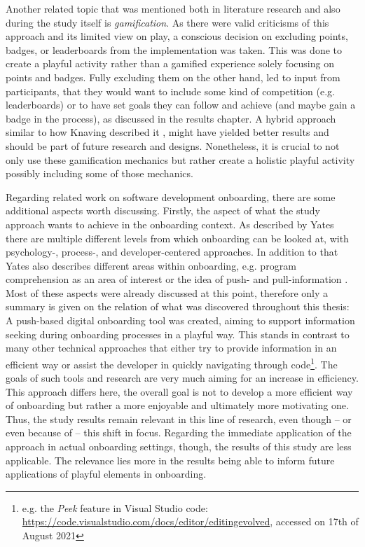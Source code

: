 Another related topic that was mentioned both in literature research and also during the study itself is \textit{gamification}. As there were valid criticisms of this approach and its limited view on play, a conscious decision on excluding points, badges, or leaderboards from the implementation was taken. This was done to create a playful activity rather than a gamified experience solely focusing on points and badges. Fully excluding them on the other hand, led to input from participants, that they would want to include some kind of competition (e.g. leaderboards) or to have set goals they can follow and achieve (and maybe gain a badge in the process), as discussed in the results chapter. A hybrid approach similar to how Knaving described it \cite{knaving2013designing}, might have yielded better results and should be part of future research and designs. Nonetheless, it is crucial to not only use these gamification mechanics but rather create a holistic playful activity possibly including some of those mechanics.

Regarding related work on software development onboarding, there are some additional aspects worth discussing. Firstly, the aspect of what the study approach wants to achieve in the onboarding context. As described by Yates there are multiple different levels from which onboarding can be looked at, with psychology-, process-, and developer-centered approaches. In addition to that Yates also describes different areas within onboarding, e.g. program comprehension as an area of interest or the idea of push- and pull-information \cite{yates2014onboarding}. Most of these aspects were already discussed at this point, therefore only a summary is given on the relation of what was discovered throughout this thesis: A push-based digital onboarding tool was created, aiming to support information seeking during onboarding processes in a playful way. This stands in contrast to many other technical approaches that either try to provide information in an efficient way \cite{dominic2020onboarding} or assist the developer in quickly navigating through code\footnote{e.g. the \textit{Peek} feature in Visual Studio code: \url{https://code.visualstudio.com/docs/editor/editingevolved}, accessed on 17th of August 2021}. The goals of such tools and research are very much aiming for an increase in efficiency. This approach differs here, the overall goal is not to develop a more efficient way of onboarding but rather a more enjoyable and ultimately more motivating one. Thus, the study results remain relevant in this line of research, even though -- or even because of -- this shift in focus. Regarding the immediate application of the approach in actual onboarding settings, though, the results of this study are less applicable. The relevance lies more in the results being able to inform future applications of playful elements in onboarding.
